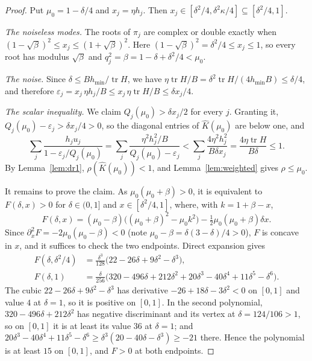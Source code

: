 \documentclass[11pt]{amsart}
\theoremstyle{definition}
\theoremstyle{remark}
\numberwithin{equation}{section}
\newcommand{\tr}{\operatorname{tr}}
\newcommand{\hmin}{h_{\min}}
\begin{document}
\begin{proof}
Put $\mu_0=1-\delta/4$ and $x_j=\eta h_j$. Then $x_j\in[\delta^2/4,\delta^2\kappa/4]\subseteq[\delta^2/4,1]$.

\emph{The noiseless modes.} The roots of $\pi_j$ are complex or double exactly when $(1-\sqrt\beta)^2\le x_j\le(1+\sqrt\beta)^2$. Here $(1-\sqrt\beta)^2=\delta^2/4\le x_j\le1$, so every root has modulus $\sqrt\beta$ and $q_j^2=\beta=1-\delta+\delta^2/4<\mu_0$.

\emph{The noise.} Since $\delta\le B\hmin/\tr H$, we have $\eta\tr H/B=\delta^2\tr H/(4\hmin B)\le\delta/4$, and therefore $\varepsilon_j=x_j\,\eta h_j/B\le x_j\,\eta\tr H/B\le\delta x_j/4$.

\emph{The scalar inequality.} We claim $Q_j(\mu_0)>\delta x_j/2$ for every $j$. Granting it, $Q_j(\mu_0)-\varepsilon_j>\delta x_j/4>0$, so the diagonal entries of $\widehat K(\mu_0)$ are below one, and
\[
\sum_j\frac{h_ju_j}{1-\varepsilon_j/Q_j(\mu_0)}=\sum_j\frac{\eta^2h_j^2/B}{Q_j(\mu_0)-\varepsilon_j}<\sum_j\frac{4\eta^2h_j^2}{B\delta x_j}=\frac{4\eta\tr H}{B\delta}\le1 .
\]
By Lemma~\ref{lem:dr1}, $\rho(\widehat K(\mu_0))<1$, and Lemma~\ref{lem:weighted} gives $\rho\le\mu_0$.

It remains to prove the claim. As $\mu_0(\mu_0+\beta)>0$, it is equivalent to $F(\delta,x)>0$ for $\delta\in(0,1]$ and $x\in[\delta^2/4,1]$, where, with $k=1+\beta-x$,
\[
F(\delta,x)=(\mu_0-\beta)\bigl((\mu_0+\beta)^2-\mu_0k^2\bigr)-\tfrac12\mu_0(\mu_0+\beta)\delta x .
\]
Since $\partial_x^2F=-2\mu_0(\mu_0-\beta)<0$ (note $\mu_0-\beta=\delta(3-\delta)/4>0$), $F$ is concave in $x$, and it suffices to check the two endpoints. Direct expansion gives
\begin{align*}
F(\delta,\delta^2/4)&=\frac{\delta^3}{128}\bigl(22-26\delta+9\delta^2-\delta^3\bigr),\\
F(\delta,1)&=\frac{\delta}{256}\bigl(320-496\delta+212\delta^2+20\delta^3-40\delta^4+11\delta^5-\delta^6\bigr).
\end{align*}
The cubic $22-26\delta+9\delta^2-\delta^3$ has derivative $-26+18\delta-3\delta^2<0$ on $[0,1]$ and value $4$ at $\delta=1$, so it is positive on $[0,1]$. In the second polynomial, $320-496\delta+212\delta^2$ has negative discriminant and its vertex at $\delta=124/106>1$, so on $[0,1]$ it is at least its value $36$ at $\delta=1$; and $20\delta^3-40\delta^4+11\delta^5-\delta^6\ge\delta^3(20-40\delta-\delta^3)\ge-21$ there. Hence the polynomial is at least $15$ on $[0,1]$, and $F>0$ at both endpoints.
\end{proof}
\end{document}
